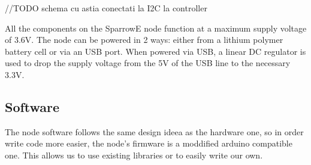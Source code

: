 //TODO schema cu astia conectati la I2C la controller

All the components on the SparrowE node function at a maximum supply voltage of 3.6V. The node can be powered in 2 ways: either from a lithium polymer battery 
cell or via an USB port. When powered via USB, a linear DC regulator is used to drop the supply voltage from the 5V of the USB line to the necessary 3.3V.

\subsection{Software}

The node software follows the same design ideea as the hardware one, so in order write code more easier, the node's firmware is a moddified arduino compatible one. This allows us to use existing libraries or to easily write our own.




